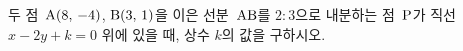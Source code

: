 두 점~$\mathrm{A}(8,\,-4)$, $\mathrm{B}(3,\,1)$을 이은 선분~$\mathrm{AB}$를 $2:3$으로 내분하는 점~$\mathrm{P}$가 직선~$x-2y+k=0$ 위에 있을 때, 상수 $k$의 값을 구하시오.
